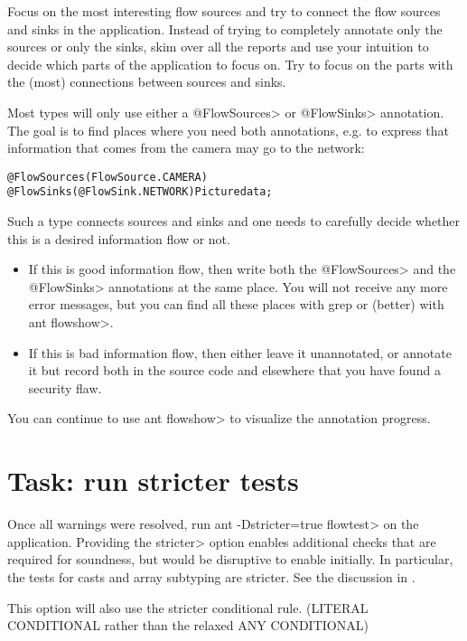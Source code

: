 Focus on the most interesting flow sources and try to connect the flow
sources and sinks in the application. Instead of trying to completely
annotate only the sources or only the sinks, skim over all the reports
and use your intuition to decide which parts of the application to
focus on. Try to focus on the parts with the (most) connections
between sources and sinks.

Most types will only use either a \<@FlowSources> or \<@FlowSinks>
annotation.
The goal is to find places where you need both annotations, e.g. to
express that information that comes from the camera may go to the
network:

\begin{alltt}
    @FlowSources(FlowSource.CAMERA)
    @FlowSinks(@FlowSink.NETWORK) Picture data;
\end{alltt}

Such a type connects sources and sinks and one needs to carefully
decide whether this is a desired information flow or not.
\begin{itemize}
\item If this is good information flow, then write both the \<@FlowSources>
  and the \<@FlowSinks> annotations at the same place. You will not
  receive any more error messages, but you can find all these places
  with grep or (better) with \<ant flowshow>.
\item If this is bad information flow, then either leave it unannotated,
  or annotate it but record both in the source code and elsewhere that
  you have found a security flaw.
\end{itemize}

You can continue to use \<ant flowshow> to visualize the annotation
progress.

\section{Task: run stricter tests}
Once all warnings were resolved, run \<ant -Dstricter=true flowtest> on
the application.
Providing the \<stricter> option enables additional checks that are
required for soundness, but would be disruptive to enable initially.
In particular, the tests for casts and array subtyping are stricter.
See the discussion in .

This option will also use the stricter conditional rule. (LITERAL
\flowsto{} CONDITIONAL rather than the relaxed ANY \flowsto{} CONDITIONAL)



